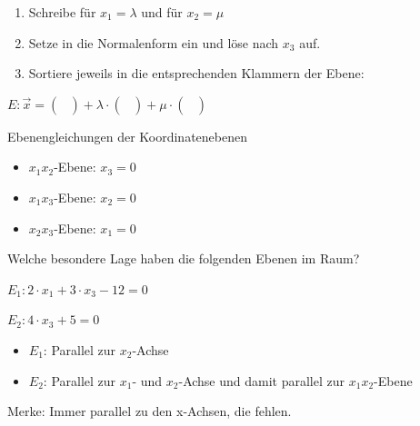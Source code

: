 \documentclass[paper=a6,ngerman,twoside=true,fontsize=14pt, parskip = half]{scrartcl}
\begin{document}
\begin{antwort}
	\begin{enumerate} 
		\item Schreibe für $x_1 = \lambda$ und für $x_2=\mu$	
		\item Setze in die Normalenform ein und löse nach $x_3$ auf.
		\item Sortiere jeweils in die entsprechenden Klammern der Ebene:			
	\end{enumerate} 
	$E:\vec{x}=\left(\begin{array}{c}  \\  \\ \end{array} \right)+\lambda \cdot \left(\begin{array}{c}  \\  \\ \end{array} \right)+\mu \cdot \left(\begin{array}{c}  \\ \\ \end{array} \right)$
	
\end{antwort}
\begin{frage}
	Ebenengleichungen der Koordinatenebenen
\end{frage}
\begin{antwort}

	\begin{itemize} 
		\item $x_1x_2$-Ebene: $x_3=0$	
		\item $x_1x_3$-Ebene: $x_2=0$
		\item $x_2x_3$-Ebene: $x_1=0$
	\end{itemize} 
	
\end{antwort}
\begin{frage}
	Welche besondere Lage haben die folgenden Ebenen im Raum?
	
	$E_1: 2 \cdot x_1+3  \cdot x_3  -12 = 0$
	
	$E_2: 4 \cdot x_3 +5 = 0$	
	
\end{frage}
\begin{antwort}
	
	\begin{itemize} 
		\item $E_1$: Parallel zur $x_2$-Achse	
		\item $E_2$: Parallel zur $x_1$- und $x_2$-Achse und damit parallel zur $x_1x_2$-Ebene
	\end{itemize} 
	\bigskip
	Merke: Immer parallel zu den x-Achsen, die fehlen.
	
\end{antwort}
\end{document}
